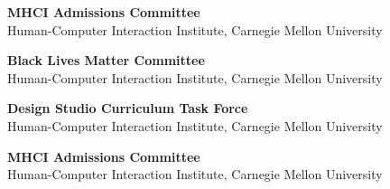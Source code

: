 \documentclass[11pt]{article} %
\begin{document}
 \textbf{MHCI Admissions Committee}\\
Human-Computer Interaction Institute, Carnegie Mellon University
\medskip

 \textbf{Black Lives Matter Committee}\\
Human-Computer Interaction Institute, Carnegie Mellon University
\medskip

 \textbf{Design Studio Curriculum Task Force}\\
Human-Computer Interaction Institute, Carnegie Mellon University
\medskip

 \textbf{MHCI Admissions Committee}\\
Human-Computer Interaction Institute, Carnegie Mellon University
\medskip



\vfill %





\end{document}
